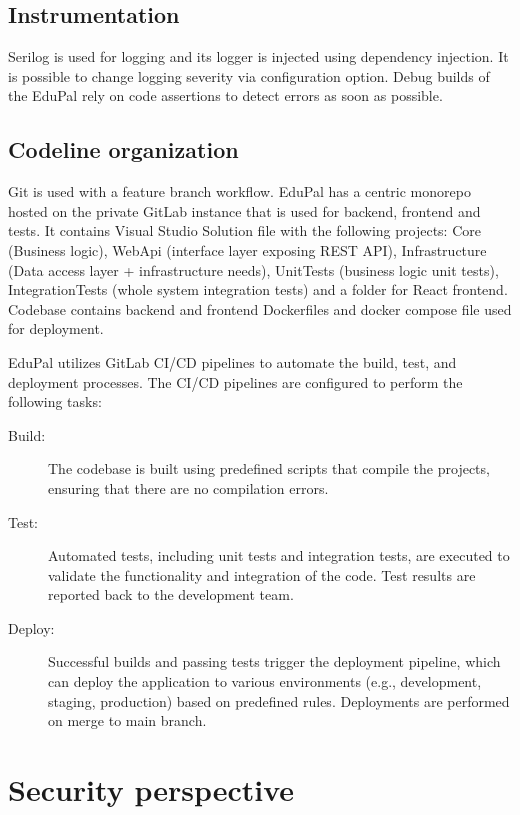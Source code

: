 \subsection{Instrumentation}

Serilog is used for logging and its logger is injected using dependency injection. It is possible to change logging severity via configuration option. Debug builds of the EduPal rely on code assertions to detect errors as soon as possible.

\subsection{Codeline organization}

Git is used with a feature branch workflow. EduPal has a centric monorepo hosted on the private GitLab instance that is used for backend, frontend and tests. It contains Visual Studio Solution file with the following projects: Core (Business logic), WebApi (interface layer exposing REST API), Infrastructure (Data access layer + infrastructure needs), UnitTests (business logic unit tests), IntegrationTests (whole system integration tests) and a folder for React frontend. Codebase contains backend and frontend Dockerfiles and docker compose file used for deployment.

EduPal utilizes GitLab CI/CD pipelines to automate the build, test, and deployment processes. The CI/CD pipelines are configured to perform the following tasks:

\begin{description}
\item[Build:] The codebase is built using predefined scripts that compile the projects, ensuring that there are no compilation errors.

\item[Test:] Automated tests, including unit tests and integration tests, are executed to validate the functionality and integration of the code. Test results are reported back to the development team.

\item[Deploy:] Successful builds and passing tests trigger the deployment pipeline, which can deploy the application to various environments (e.g., development, staging, production) based on predefined rules. Deployments are performed on merge to main branch.
\end{description}

\section{Security perspective}

